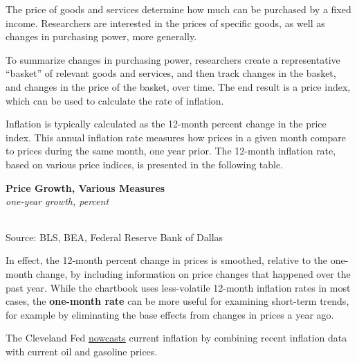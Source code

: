 \documentclass{report}
\begin{document}
{\begin{minipage}{0.76\textwidth}
\small The price of goods and services determine how much can be purchased by a fixed income. Researchers are interested in the prices of specific goods, as well as changes in purchasing power, more generally.

To summarize changes in purchasing power, researchers create a representative ``basket'' of relevant goods and services, and then track changes in the basket, and changes in the price of the basket, over time. The end result is a price index, which can be used to calculate the rate of inflation.

Inflation is typically calculated as the 12-month percent change in the price index. This annual inflation rate measures how prices in a given month compare to prices during the same month, one year prior. The 12-month inflation rate, based on various price indices, is presented in the following table. 
\vspace{1mm}

\normalsize \textbf{Price Growth, Various Measures}\\
\footnotesize{\textit{one-year growth, percent}}
\vspace*{-4mm}

\hspace*{-2mm}  \setlength{\tabcolsep}{3.1pt} \color{black!90}
	{\renewcommand{\arraystretch}{1.5}
		\begin{tabular}{p{30mm} R{7.6mm} R{7.6mm} R{7.6mm} R{7.6mm} R{7.6mm} R{7.6mm} 
		   R{9.2mm} R{8.5mm}}
			  \hline
		\end{tabular}}\vspace{-1mm}
		
\footnotesize{Source: BLS, BEA, Federal Reserve Bank of Dallas}
\vspace{2mm}

\small In effect, the 12-month percent change in prices is smoothed, relative to the one-month change, by including information on price changes that happened over the past year. While the chartbook uses less-volatile 12-month inflation rates in most cases, the \textbf{one-month rate} can be more useful for examining short-term trends, for example by eliminating the base effects from changes in prices a year ago. 

 The Cleveland Fed \href{https://www.clevelandfed.org/indicators-and-data/inflation-nowcasting}{nowcasts} current inflation by combining recent inflation data with current oil and gasoline prices. 
\vspace{1mm} \hypertarget{cpimm}{}


\end{minipage}}
\end{document}
